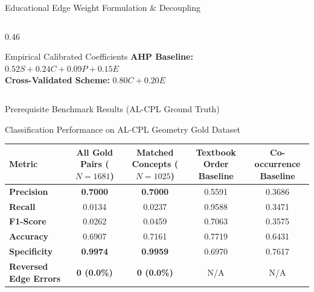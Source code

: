 \documentclass[aspectratio=169,10pt]{beamer}
\begin{document}
\begin{frame}{Educational Edge Weight Formulation \& Decoupling}
\begin{columns}[T]
\begin{column}{0.46\textwidth}
            \begin{exampleblock}{Empirical Calibrated Coefficients}
                \footnotesize
                \textbf{AHP Baseline:} $0.52S + 0.24C + 0.09P + 0.15E$\\
                \textbf{Cross-Validated Scheme:} $0.80C + 0.20E$
            \end{exampleblock}
        \end{column}
    \end{columns}
\end{frame}

\begin{frame}{Prerequisite Benchmark Results (AL-CPL Ground Truth)}
    \begin{block}{Classification Performance on AL-CPL Geometry Gold Dataset}
        \centering
        \small
        \begin{tabular}{lcccc}
            \toprule
            \textbf{Metric} & \textbf{All Gold Pairs} ($N=1681$) & \textbf{Matched Concepts} ($N=1025$) & \textbf{Textbook Order Baseline} & \textbf{Co-occurrence Baseline} \\
            \midrule
            \textbf{Precision} & \textbf{0.7000} & \textbf{0.7000} & 0.5591 & 0.3686 \\
            \textbf{Recall} & 0.0134 & 0.0237 & 0.9588 & 0.3471 \\
            \textbf{F1-Score} & 0.0262 & 0.0459 & 0.7063 & 0.3575 \\
            \textbf{Accuracy} & 0.6907 & 0.7161 & 0.7719 & 0.6431 \\
            \textbf{Specificity} & \textbf{0.9974} & \textbf{0.9959} & 0.6970 & 0.7617 \\
            \textbf{Reversed Edge Errors} & \textbf{0 (0.0\%)} & \textbf{0 (0.0\%)} & N/A & N/A \\
            \bottomrule
        \end{tabular}
    \end{block}


\end{frame}
\end{document}
